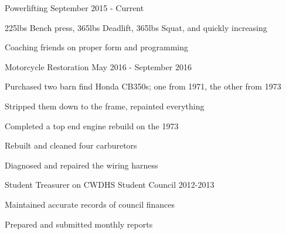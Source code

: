 

\begin{cventries}

  \cventry
    {Powerlifting} %
    {} %
    {} %
    {September 2015 - Current} %
    {
      \begin{cvitems} %
        \item {225lbs Bench press, 365lbs Deadlift, 365lbs Squat, and quickly increasing}
        \item {Coaching friends on proper form and programming}
      \end{cvitems}
    }

  \cventry
    {Motorcycle Restoration} %
    {} %
    {} %
    {May 2016 - September 2016} %
    {
      \begin{cvitems} %
        \item {Purchased two barn find Honda CB350s; one from 1971, the other from 1973}
        \item {Stripped them down to the frame, repainted everything}
        \item {Completed a top end engine rebuild on the 1973}
        \item {Rebuilt and cleaned four carburetors}
        \item {Diagnosed and repaired the wiring harness}
      \end{cvitems}
    }
  \cventry
    {Student Treasurer on CWDHS Student Council} %
    {} %
    {} %
    {2012-2013} %
    {
      \begin{cvitems} %
        \item {Maintained accurate records of council finances}
        \item {Prepared and submitted monthly reports}
      \end{cvitems}
    }
\end{cventries}
